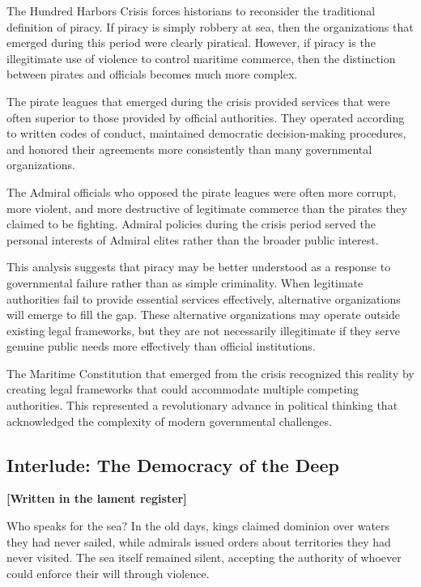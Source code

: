 The Hundred Harbors Crisis forces historians to reconsider the
traditional definition of piracy. If piracy is simply robbery at sea,
then the organizations that emerged during this period were clearly
piratical. However, if piracy is the illegitimate use of violence to
control maritime commerce, then the distinction between pirates and
officials becomes much more complex.

The pirate leagues that emerged during the crisis provided services that
were often superior to those provided by official authorities. They
operated according to written codes of conduct, maintained democratic
decision-making procedures, and honored their agreements more
consistently than many governmental organizations.

The Admiral officials who opposed the pirate leagues were often more
corrupt, more violent, and more destructive of legitimate commerce than
the pirates they claimed to be fighting. Admiral policies during the
crisis period served the personal interests of Admiral elites rather
than the broader public interest.

This analysis suggests that piracy may be better understood as a
response to governmental failure rather than as simple criminality. When
legitimate authorities fail to provide essential services effectively,
alternative organizations will emerge to fill the gap. These alternative
organizations may operate outside existing legal frameworks, but they
are not necessarily illegitimate if they serve genuine public needs more
effectively than official institutions.

The Maritime Constitution that emerged from the crisis recognized this
reality by creating legal frameworks that could accommodate multiple
competing authorities. This represented a revolutionary advance in
political thinking that acknowledged the complexity of modern
governmental challenges.

\subsection{Interlude: The Democracy of the
Deep}\label{interlude-the-democracy-of-the-deep}

\textbf{{[}Written in the lament register{]}}

Who speaks for the sea? In the old days, kings claimed dominion over
waters they had never sailed, while admirals issued orders about
territories they had never visited. The sea itself remained silent,
accepting the authority of whoever could enforce their will through
violence.

